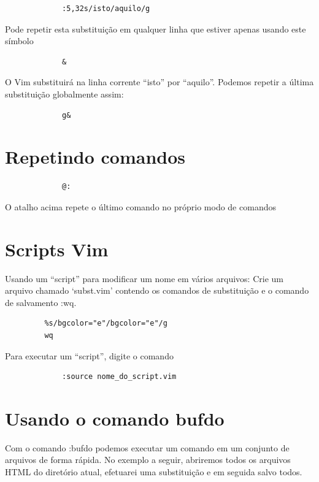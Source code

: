 \documentclass[10pt,a4paper,openany]{book}
\begin{document}
\begin{verbatim}
			 :5,32s/isto/aquilo/g
\end{verbatim}

Pode repetir esta substituição em qualquer linha que estiver apenas usando este símbolo

\begin{verbatim}
			 &
\end{verbatim}

O Vim substituirá na linha corrente ``isto'' por ``aquilo''. Podemos
repetir a última substituição globalmente assim:
	
\begin{verbatim}
             g&
\end{verbatim}

\section{Repetindo comandos}\label{Repetindo comandos}

\begin{verbatim}
			 @:
\end{verbatim}

O atalho acima repete o último comando no próprio modo de comandos

\section{Scripts Vim}\label{Scripts Vim}
Usando um ``script'' para modificar um nome em vários arquivos: 
Crie um arquivo chamado `subst.vim' contendo os comandos de substituição e o
comando de salvamento :wq.

\begin{verbatim}
		 %s/bgcolor="e"/bgcolor="e"/g
		 wq
\end{verbatim}

Para executar um ``script'', digite o comando

\begin{verbatim}
			 :source nome_do_script.vim
\end{verbatim}

\section{Usando o comando bufdo}\label{Usando o comando bufdo}

Com o comando :bufdo podemos executar um comando em um
conjunto de arquivos de forma rápida. No exemplo a seguir, abriremos
todos os arquivos HTML do diretório atual, efetuarei uma substituição
e em seguida salvo todos.
\end{document}
